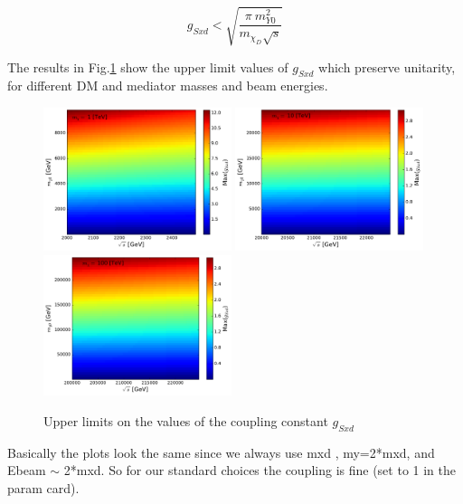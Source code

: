 \documentclass[epj,nopacs,fleqn]{svjour}
\begin{document}
\begin{equation}
g_{Sxd} < \sqrt{ \frac{\pi \ m^2 _{Y0}}{ m_{\chi_D} \sqrt{s} }  } 
\end{equation}

The results in Fig.\ref{couplings} show the upper limit values of $g_{Sxd}$ which preserve unitarity, for different DM and mediator masses and beam energies.

\begin{figure}[!b]
	\centering
	\subfigure
	{ \includegraphics[width=0.49\textwidth]{Fig/COUPLINGS/coupling_constant_ul_Mxd_1000.pdf}}
	\subfigure
	{ \includegraphics[width=0.49\textwidth]{Fig/COUPLINGS/coupling_constant_ul_Mxd_10000.pdf}}
	\subfigure
	{ \includegraphics[width=0.49\textwidth]{Fig/COUPLINGS/coupling_constant_ul_Mxd_100000.pdf}}
	\caption{Upper limits on the values of the coupling constant  $g_{Sxd}$  }
	\label{couplings}
\end{figure}

Basically the plots look the same since we always use mxd , my=2*mxd, and Ebeam $\sim$ 2*mxd. So for our standard choices the coupling is fine (set to 1 in the param card).
\end{document}

